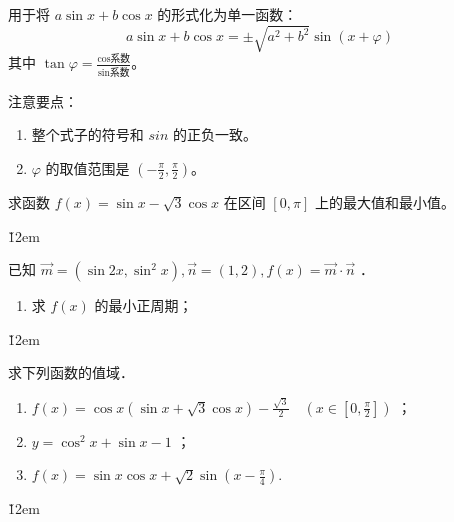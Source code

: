 \vspace{2em}

\begin{theorem}[辅助角公式]
    用于将 $a\sin x + b\cos x$ 的形式化为单一函数：
    $$ a\sin x + b\cos x = \pm \sqrt{a^2+b^2} \sin(x + \varphi) $$
    其中 $\tan\varphi = \frac{\text{cos系数}}{\text{sin系数}}$。

    注意要点：
    \begin{enumerate}
        \item 整个式子的符号和 $sin$ 的正负一致。
        \item $\varphi$ 的取值范围是 $(-\frac{\pi}{2}, \frac{\pi}{2})$。
    \end{enumerate}
\end{theorem}

\begin{example}
    求函数 $f(x) = \sin x - \sqrt{3}\cos x$ 在区间 $[0, \pi]$ 上的最大值和最小值。
\end{example}

\v{12em}

\begin{example}
    已知 $\overrightarrow{m}=\left(\sin 2 x, \sin ^2 x\right), \overrightarrow{n}=(1,2), f(x)=\overrightarrow{m} \cdot \overrightarrow{n}$ ．
    \begin{enumerate}
        \item 求 $f(x)$ 的最小正周期；
    \end{enumerate}
\end{example}

\v{12em}

\begin{example}
    求下列函数的值域．
    \begin{enumerate}
        \item $f(x)=\cos x(\sin x+\sqrt{3} \cos x)-\frac{\sqrt{3}}{2} \quad\left(x \in\left[0, \frac{\pi}{2}\right]\right)$ ；
        \item $y=\cos ^2 x+\sin x-1$ ；
        \item $f(x)=\sin x \cos x+\sqrt{2} \sin \left(x-\frac{\pi}{4}\right)$.
    \end{enumerate}
\end{example}
\v{12em}

\vspace{2em}